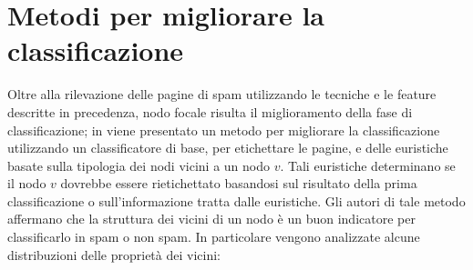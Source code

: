 \section{Metodi per migliorare la classificazione}
Oltre alla rilevazione delle pagine di spam utilizzando le tecniche e le feature descritte in precedenza, nodo focale risulta il miglioramento della fase di classificazione; in \cite{Gan:2007:IWS:1244408.1244412} viene presentato un metodo per migliorare la classificazione  utilizzando un classificatore di base, per etichettare le pagine, e delle euristiche basate sulla tipologia dei nodi vicini a un nodo \(v\). Tali euristiche determinano se il nodo \(v\) dovrebbe essere rietichettato basandosi sul risultato della prima classificazione o sull'informazione tratta dalle euristiche. Gli autori di tale metodo affermano che  la struttura dei vicini di un nodo è un buon indicatore  per classificarlo in  spam o non spam. In particolare vengono analizzate alcune distribuzioni delle proprietà dei vicini:
